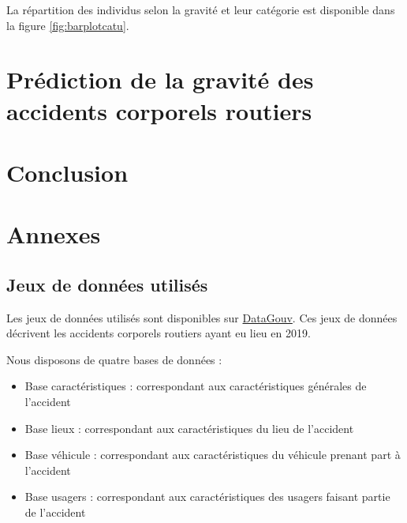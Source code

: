 \documentclass[french,]{tp}
\providecommand{\tightlist}{%
  \setlength{\itemsep}{0pt}\setlength{\parskip}{0pt}}
\begin{document}
La répartition des individus selon la gravité et leur catégorie est disponible dans la figure \ref{fig:barplotcatu}.

\newpage

\hypertarget{pruxe9diction-de-la-gravituxe9-des-accidents-corporels-routiers}{%
\section{Prédiction de la gravité des accidents corporels routiers}\label{pruxe9diction-de-la-gravituxe9-des-accidents-corporels-routiers}}

\newpage

\hypertarget{conclusion}{%
\section{Conclusion}\label{conclusion}}

\newpage

\hypertarget{appendix-annexes}{%
\appendix}


\hypertarget{annexes}{%
\section{Annexes}\label{annexes}}

\hypertarget{jeux-donnees}{%
\subsection{Jeux de données utilisés}\label{jeux-donnees}}

Les jeux de données utilisés sont disponibles sur \href{https://www.data.gouv.fr/fr/datasets/bases-de-donnees-annuelles-des-accidents-corporels-de-la-circulation-routiere-annees-de-2005-a-2019/}{DataGouv}. Ces jeux de données décrivent les accidents corporels routiers ayant eu lieu en 2019.

Nous disposons de quatre bases de données :

\begin{itemize}
\tightlist
\item
  Base caractéristiques : correspondant aux caractéristiques générales de l'accident
\item
  Base lieux : correspondant aux caractéristiques du lieu de l'accident
\item
  Base véhicule : correspondant aux caractéristiques du véhicule prenant part à l'accident
\item
  Base usagers : correspondant aux caractéristiques des usagers faisant partie de l'accident
\end{itemize}
\end{document}
